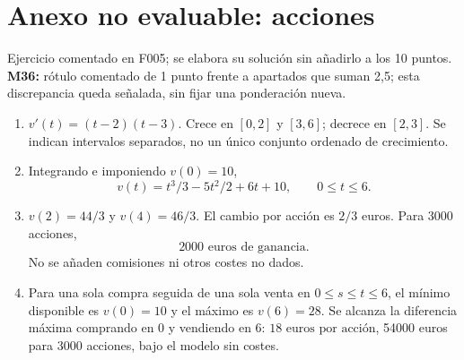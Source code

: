 \documentclass[11pt]{article}
\begin{document}
\section*{Anexo no evaluable: acciones}
Ejercicio comentado en F005; se elabora su solución sin añadirlo a los 10 puntos. \textbf{M36:} rótulo comentado de 1 punto frente a apartados que suman 2,5; esta discrepancia queda señalada, sin fijar una ponderación nueva.
\begin{enumerate}[label=(\alph*)]
\item $v'(t)=(t-2)(t-3)$. Crece en $[0,2]$ y $[3,6]$; decrece en $[2,3]$. Se indican intervalos separados, no un único conjunto ordenado de crecimiento.
\item Integrando e imponiendo $v(0)=10$,
\[
\boxed{v(t)=t^3/3-5t^2/2+6t+10},\qquad0\leq t\leq6.
\]
\item $v(2)=44/3$ y $v(4)=46/3$. El cambio por acción es $2/3$ euros. Para 3000 acciones,
\[ \boxed{2000\text{ euros de ganancia}}. \]
No se añaden comisiones ni otros costes no dados.
\item Para una sola compra seguida de una sola venta en $0\leq s\leq t\leq6$, el mínimo disponible es $v(0)=10$ y el máximo es $v(6)=28$. Se alcanza la diferencia máxima comprando en 0 y vendiendo en 6: $\boxed{18\text{ euros por acción}}$, 54000 euros para 3000 acciones, bajo el modelo sin costes.
\end{enumerate}
\end{document}
